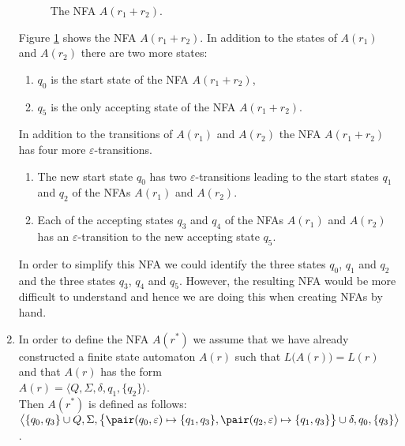 \begin{enumerate}
      \begin{figure}[!ht]
        \centering
      \caption{The \textsc{NFA} $A(r_1 + r_2)$.}
      \label{fig:aPlus.eps}
      \end{figure}
      Figure \ref{fig:aPlus.eps} shows the \textsc{NFA} $A(r_1 + r_2)$.
      In addition to the states of $A(r_1)$ and $A(r_2)$ there are two more states:
      \begin{enumerate}
      \item $q_0$ is the start state of the \textsc{NFA} $A(r_1 + r_2)$,
      \item $q_5$ is the only accepting state of the \textsc{NFA} $A(r_1 + r_2)$.
      \end{enumerate}
      In addition to the transitions of $A(r_1)$ and $A(r_2)$ the \textsc{NFA} $A(r_1+r_2)$
      has four more $\varepsilon$-transitions.
      \begin{enumerate}
      \item The new start state $q_0$ has two
            $\varepsilon$-transitions leading to the start states $q_1$ and $q_2$ of the \textsc{NFA}s
            $A(r_1)$ and $A(r_2)$.
      \item Each of the accepting states $q_3$ and $q_4$ of the \textsc{NFA}s
             $A(r_1)$ and $A(r_2)$ has an $\varepsilon$-transition to the new accepting state $q_5$.
      \end{enumerate}
      In order to simplify this \textsc{NFA} we could identify the three states
      $q_0$, $q_1$ and $q_2$ and the three states $q_3$, $q_4$ and $q_5$.  However, the resulting \textsc{NFA}
      would be more difficult to understand and hence we are \underline{} doing this when creating 
      \textsc{NFA}s by hand.
\item In order to define the \textsc{NFA} $A(r^*)$ we assume that we have already constructed a finite
      state automaton $A(r)$ such that $L\bigl(A(r)\bigr) = L(r)$ and that $A(r)$ has the form
      \\[0.2cm]
      \hspace*{1.3cm}
      $A(r) = \bigl\langle Q, \Sigma, \delta, q_1, \{ q_2 \} \bigr\rangle$.
      \\[0.2cm]
      Then  $A(r^*)$ is defined as follows:
      \\[0.2cm]
      \hspace*{0.8cm}
       $\bigl\langle \{ q_0, q_3 \} \cup Q, \Sigma, 
                \bigl\{ \pair(q_0,\varepsilon) \mapsto \{q_1, q_3\}, \pair(q_2,\varepsilon) \mapsto \{q_1, q_3\} \bigr\} 
                \cup \delta, q_0, \{ q_3 \} \bigr\rangle$.
      \\[0.2cm]



\end{enumerate}
